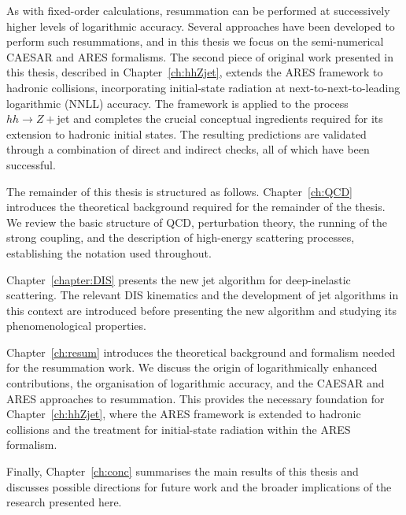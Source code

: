 As with fixed-order calculations, resummation can be performed at successively
higher levels of logarithmic accuracy. Several approaches have been developed to
perform such resummations, and in this thesis we focus on the semi-numerical
\textsc{CAESAR} and \textsc{ARES} formalisms. The second piece of original work
presented in this thesis, described in Chapter~\ref{ch:hhZjet}, extends the
\textsc{ARES} framework to hadronic collisions, incorporating initial-state
radiation at next-to-next-to-leading logarithmic (NNLL) accuracy. The framework
is applied to the process $hh\to Z+$jet and completes the crucial conceptual
ingredients required for its extension to hadronic initial states. The resulting
predictions are validated through a combination of direct and indirect checks,
all of which have been successful.

The remainder of this thesis is structured as follows. Chapter~\ref{ch:QCD}
introduces the theoretical background required for the remainder of the thesis.
We review the basic structure of QCD, perturbation theory, the running of the
strong coupling, and the description of high-energy scattering processes,
establishing the notation used throughout.

Chapter~\ref{chapter:DIS} presents the new jet algorithm for deep-inelastic
scattering. The relevant DIS kinematics and the development of jet algorithms in
this context are introduced before presenting the new algorithm and studying its
phenomenological properties.

Chapter~\ref{ch:resum} introduces the theoretical background and formalism needed
for the resummation work. We discuss the origin of logarithmically enhanced
contributions, the organisation of logarithmic accuracy, and the
\textsc{CAESAR} and \textsc{ARES} approaches to resummation. This provides the
necessary foundation for Chapter~\ref{ch:hhZjet}, where the \textsc{ARES} framework
is extended to hadronic collisions and the treatment for initial-state radiation within the
\textsc{ARES} formalism.

Finally, Chapter~\ref{ch:conc} summarises the main results of this thesis and
discusses possible directions for future work and the broader implications of the
research presented here.